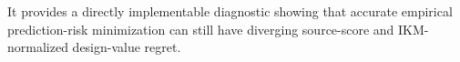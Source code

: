 It provides a directly implementable diagnostic showing that accurate empirical prediction-risk minimization can still have diverging source-score and IKM-normalized design-value regret.